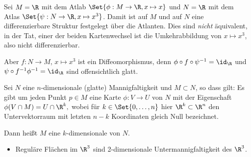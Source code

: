 \begin{ex}
    Sei $M = \R$ mit dem Atlab $\Set{\phi: M \to \R, x \mapsto x}$ und $N = \R$ mit dem Atlas $\Set{\psi: N \to \R, x \mapsto x^3}$.
    Damit ist auf $M$ und auf $N$ eine differenzierbare Struktur festgelegt über die Atlanten.
    Dies sind \emph{nicht} äquivalent, in der Tat, einer der beiden Kartenwechsel ist die Umkehrabbildung von $x \mapsto x^3$, also nicht differenzierbar.

    Aber $f: N \to M$, $x \mapsto x^3$ ist ein Diffeomorphismus, denn $\phi \circ f \circ \psi^{-1} = \id_\R$ und $\psi \circ f^{-1} \phi^{-1} = \id_\R$ sind offensichtlich glatt.
\end{ex}

\begin{df} \label{2.3}
    Sei $N$ eine $n$-dimensionale (glatte) Mannigfaltigkeit und $M \subset N$,
    so dass gilt: Es gibt um jeden Punkt $p \in M$ eine Karte $\phi: V \to U$ von $N$ mit der
    Eigenschaft
    \begin{math}
        \phi(V \cap M) = U \cap \R^k,
    \end{math}
    wobei für $k \in \Set{0, \dotsc, n}$ hier $\R^k \subset \R^n$ den Untervektorraum mit letzten $n-k$ Koordinaten gleich Null bezeichnet.

    Dann heißt $M$ eine $k$-dimensionale  von $N$.
\end{df}

\begin{ex}
    \begin{itemize}
        \item
            Reguläre Flächen im $\R^3$ sind 2-dimensionale Untermannigfaltigkeit des $\R^3$.
    \end{itemize}
\end{ex}
